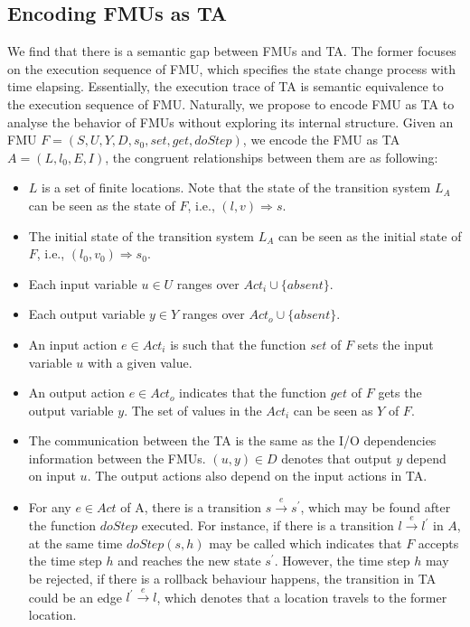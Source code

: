 \subsection{Encoding FMUs as TA}
We find that there is a semantic gap between FMUs and TA. The former focuses on the execution sequence of FMU, which specifies the state change process with time elapsing. Essentially, the execution trace of TA is semantic equivalence to the execution sequence of FMU. Naturally, we propose to encode FMU as TA to analyse the behavior of FMUs without exploring its internal structure. 
Given an FMU $F=(S,U,Y,D,s_{0},set,get,doStep)$, we encode the FMU as TA $\textit{A}=(L,l_{0},E,I)$, the congruent relationships between them are as following:
\begin{itemize}
\item
$L$ is a set of finite locations. Note that the state of the transition system $L_{\textit{A}}$ can be seen as the state of $F$, i.e., $(l,v) \Rightarrow s$.
\item
The initial state of the transition system $L_{\textit{A}}$ can be seen as the initial state of $F$, i.e., $(l_{0},v_{0}) \Rightarrow s_{0}$. 
\item
Each input variable $u \in U$ ranges over $Act_{i} \cup \{absent\}$.
\item
Each output variable $y \in Y$ ranges over $Act_{o} \cup \{absent\}$.
\item
An input action $e \in Act_{i}$ is such that the function $set$ of $F$ sets the input variable $u$ with a given value. 
\item
An output action $e \in Act_{o}$ indicates that the function $get$ of $F$ gets the output variable $y$. The set of values in the $Act_{i}$ can be seen as $Y$ of $F$.  
\item
The communication between the TA is the same as the I/O dependencies information between the FMUs. $(u,y) \in D$ denotes that output $y$ depend on input $u$. The output actions also depend on the input actions in TA.
\item
For any $e \in Act$ of A, there is a transition $s \xrightarrow{e} s^{\prime}$, which may be found after the function $doStep$ executed. For instance, if there is a transition $l \xrightarrow{e} l^{\prime}$ in $A$, at the same time $doStep(s,h)$ may be called which indicates that $F$ accepts the time step $h$ and reaches the new state $s^{\prime}$. However, the time step $h$ may be rejected, if there is a rollback behaviour happens, the transition in TA could be an edge $l^{\prime} \xrightarrow{e} l$, which denotes that a location travels to the former location.

\end{itemize}
